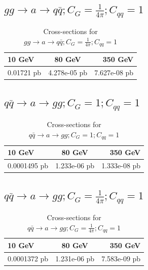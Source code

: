 \documentclass[12pt,a4paper]{article}
\begin{document}
\subsection{$g g \rightarrow a \rightarrow q \bar{q}; C_G = \frac{1}{4\pi}; C_{qq} = 1$}

\begin{table}[h!]
\begin{center}
\label{tab : table14}
\begin{tabular}{l|c|r}
\hline
\textbf{10 GeV} & \textbf{80 GeV} & \textbf{350 GeV}\\
\hline
0.01721 pb & 4.278e-05  pb  & 7.627e-08  pb  \\
\hline
\end{tabular}
\caption{Cross-sections for $g g \rightarrow a \rightarrow q \bar{q} ; C_G = \frac{1}{4\pi} ;C_{qq} =1 $ }
\end{center}
\end{table}


\subsection{$ q \bar{q} \rightarrow a \rightarrow g g ; C_G = 1;C_{qq} =1 $}

\begin{table}[h!]
\begin{center}
\label{tab : table15}
\begin{tabular}{l|c|r}
\hline
\textbf{10 GeV} & \textbf{80 GeV} & \textbf{350 GeV}\\
\hline
0.0001495 pb & 1.233e-06  pb  & 1.333e-08  pb  \\
\hline
\end{tabular}
\caption{Cross-sections for $ q \bar{q} \rightarrow a \rightarrow g g ; C_G = 1;C_{qq} =1 $ }
\end{center}
\end{table}
\pagebreak

\subsection{$ q \bar{q} \rightarrow a \rightarrow g g ; C_G = \frac{1}{4\pi} ;C_{qq} =1 $}

\begin{table}[h!]
\begin{center}
\label{tab : table16}
\begin{tabular}{l|c|r}
\hline
\textbf{10 GeV} & \textbf{80 GeV} & \textbf{350 GeV}\\
\hline
0.0001372 pb & 1.231e-06  pb  & 7.583e-09  pb  \\
\hline
\end{tabular}
\caption{Cross-sections for $ q \bar{q} \rightarrow a \rightarrow g g ; C_G = \frac{1}{4\pi} ;C_{qq} =1 $ }
\end{center}
\end{table}
\end{document}
